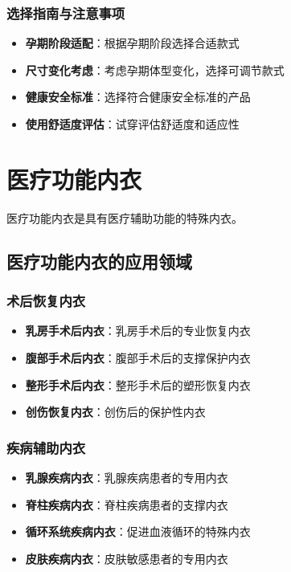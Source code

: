 \documentclass[12pt,UTF8]{ctexbook}
\begin{document}
\subsubsection{选择指南与注意事项}
\begin{itemize}[leftmargin=2cm]
	\item \textbf{孕期阶段适配}：根据孕期阶段选择合适款式
	\item \textbf{尺寸变化考虑}：考虑孕期体型变化，选择可调节款式
	\item \textbf{健康安全标准}：选择符合健康安全标准的产品
	\item \textbf{使用舒适度评估}：试穿评估舒适度和适应性
\end{itemize}

\section{医疗功能内衣}
医疗功能内衣是具有医疗辅助功能的特殊内衣。

\subsection{医疗功能内衣的应用领域}
\subsubsection{术后恢复内衣}
\begin{itemize}[leftmargin=2cm]
	\item \textbf{乳房手术后内衣}：乳房手术后的专业恢复内衣
	\item \textbf{腹部手术后内衣}：腹部手术后的支撑保护内衣
	\item \textbf{整形手术后内衣}：整形手术后的塑形恢复内衣
	\item \textbf{创伤恢复内衣}：创伤后的保护性内衣
\end{itemize}

\subsubsection{疾病辅助内衣}
\begin{itemize}[leftmargin=2cm]
	\item \textbf{乳腺疾病内衣}：乳腺疾病患者的专用内衣
	\item \textbf{脊柱疾病内衣}：脊柱疾病患者的支撑内衣
	\item \textbf{循环系统疾病内衣}：促进血液循环的特殊内衣
	\item \textbf{皮肤疾病内衣}：皮肤敏感患者的专用内衣
\end{itemize}
\end{document}
